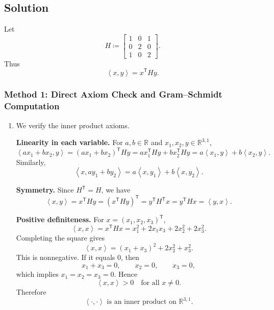 \documentclass[12pt]{article}
\newcommand{\R}{\mathbb{R}}
\newcommand{\df}{\coloneqq}
\newcommand{\ip}[2]{\left\langle #1,#2\right\rangle}
\newcommand{\T}{\mathsf{T}}
\begin{document}
\newpage
\subsection{Solution}

Let
\[
  H\df
  \begin{bmatrix}
    1&0&1\\
    0&2&0\\
    1&0&2
  \end{bmatrix}.
\]
Thus
\[
  \ip{x}{y}=x^\T H y.
\]

\subsubsection{Method 1: Direct Axiom Check and Gram--Schmidt Computation}
\begin{enumerate}[label=(\alph*)]
  \item We verify the inner product axioms.

  \textbf{Linearity in each variable.} For $a,b\in\R$ and $x_1,x_2,y\in\R^{3,1}$,
  \[
    \ip{ax_1+bx_2}{y}
    =(ax_1+bx_2)^\T Hy
    =a x_1^\T Hy+b x_2^\T Hy
    =a\ip{x_1}{y}+b\ip{x_2}{y}.
  \]
  Similarly,
  \[
    \ip{x}{ay_1+by_2}=a\ip{x}{y_1}+b\ip{x}{y_2}.
  \]

  \textbf{Symmetry.} Since $H^\T=H$, we have
  \[
    \ip{x}{y}=x^\T Hy=(x^\T Hy)^\T=y^\T H^\T x=y^\T Hx=\ip{y}{x}.
  \]

  \textbf{Positive definiteness.} For $x=(x_1,x_2,x_3)^\T$,
  \[
    \ip{x}{x}=x^\T Hx=x_1^2+2x_1x_3+2x_2^2+2x_3^2.
  \]
  Completing the square gives
  \[
    \ip{x}{x}=(x_1+x_3)^2+2x_2^2+x_3^2.
  \]
  This is nonnegative. If it equals $0$, then
  \[
    x_1+x_3=0,
    \qquad
    x_2=0,
    \qquad
    x_3=0,
  \]
  which implies $x_1=x_2=x_3=0$. Hence
  \[
    \ip{x}{x}>0\quad\text{for all }x\ne 0.
  \]
  Therefore
  \[
    \boxed{\ip{\cdot}{\cdot}\text{ is an inner product on }\R^{3,1}.}
  \]


\end{enumerate}
\end{document}
